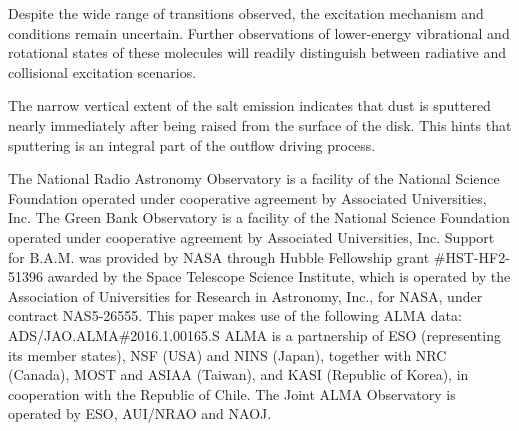 \documentclass[twocolumn]{aastex62}
\begin{document}
Despite the wide range of transitions observed, the excitation mechanism and
conditions remain uncertain.  Further observations of lower-energy vibrational
and rotational states of these molecules will readily distinguish between
radiative and collisional excitation scenarios.

The narrow vertical extent of the salt emission indicates that dust is sputtered
nearly immediately after being raised from the surface of the disk.  This hints
that sputtering is an integral part of the outflow driving process.


\acknowledgements
The National Radio Astronomy Observatory is a facility of the National Science
Foundation operated under cooperative agreement by Associated Universities,
Inc. The Green Bank Observatory is a facility of the National Science
Foundation operated under cooperative agreement by Associated Universities,
Inc. Support for B.A.M. was provided by NASA through Hubble Fellowship grant
\#HST-HF2-51396 awarded by the Space Telescope Science Institute, which is
operated by the Association of Universities for Research in Astronomy, Inc.,
for NASA, under contract NAS5-26555. 
This paper makes use of the following ALMA data: ADS/JAO.ALMA\#2016.1.00165.S
ALMA is a partnership of ESO (representing its member states), NSF (USA) and
NINS (Japan), together with NRC (Canada), MOST and ASIAA (Taiwan), and KASI
(Republic of Korea), in cooperation with the Republic of Chile. The Joint ALMA
Observatory is operated by ESO, AUI/NRAO and NAOJ.


\end{document}

